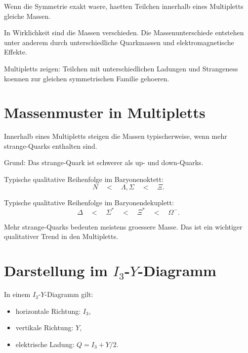 \begin{notebox}
Wenn die Symmetrie exakt waere, haetten Teilchen innerhalb eines Multipletts gleiche
Massen.

In Wirklichkeit sind die Massen verschieden.
Die Massenunterschiede entstehen unter anderem durch unterschiedliche Quarkmassen
und elektromagnetische Effekte.
\end{notebox}

\begin{examtipbox}
Multipletts zeigen:
Teilchen mit unterschiedlichen Ladungen und Strangeness koennen zur gleichen
symmetrischen Familie gehoeren.
\end{examtipbox}

\section{Massenmuster in Multipletts}

\begin{conceptbox}
Innerhalb eines Multipletts steigen die Massen typischerweise, wenn mehr strange-Quarks
enthalten sind.

Grund:
Das strange-Quark ist schwerer als up- und down-Quarks.
\end{conceptbox}

\begin{notebox}
Typische qualitative Reihenfolge im Baryonenoktett:
\[
    N
    \quad < \quad
    \Lambda,\Sigma
    \quad < \quad
    \Xi.
\]

Typische qualitative Reihenfolge im Baryonendekuplett:
\[
    \Delta
    \quad < \quad
    \Sigma^*
    \quad < \quad
    \Xi^*
    \quad < \quad
    \Omega^-.
\]
\end{notebox}

\begin{examtipbox}
Mehr strange-Quarks bedeuten meistens groessere Masse.
Das ist ein wichtiger qualitativer Trend in den Multipletts.
\end{examtipbox}

\section{Darstellung im $I_3$-$Y$-Diagramm}

\begin{conceptbox}
In einem $I_3$-$Y$-Diagramm gilt:
\begin{itemize}
    \item horizontale Richtung: $I_3$,
    \item vertikale Richtung: $Y$,
    \item elektrische Ladung: $Q=I_3+Y/2$.
\end{itemize}
\end{conceptbox}

